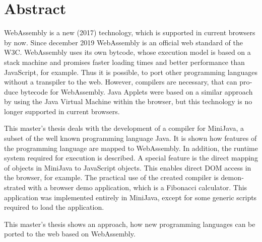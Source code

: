 \chapter{Abstract}


\begin{english}
WebAssembly is a new (2017) technology, which is supported in current browsers by now. Since december 2019 WebAssembly is an official web standard of the W3C. Web\-As\-sem\-bly uses its own bytcode, whose execution model is based on a stack machine and promises faster loading times and better performance than JavaScript, for example. Thus it is possible, to port other programming languages without a transpiler to the web. However, compilers are necessary, that can produce bytecode for WebAssembly. Java Applets were based on a similar approach by using the Java Virtual Machine within the browser, but this technology is no longer supported in current browsers.

This master's thesis deals with the development of a compiler for MiniJava, a subset of the well known programming language Java. It is shown how features of the programming language are mapped to WebAssembly. In addition, the runtime system required for execution is described. A special feature is the direct mapping of objects in MiniJava to JavaScript objects. This enables direct DOM access in the browser, for example. The practical use of the created compiler is demonstrated with a browser demo application, which is a Fibonacci calculator. This application was implemented entirely in MiniJava, except for some generic scripts required to load the application.

This master's thesis shows an approach, how new programming languages can be ported to the web based on WebAssembly.
\end{english}
